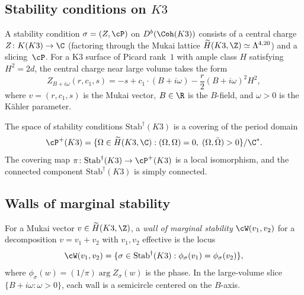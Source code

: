 \subsection{Stability conditions on $K3$}
\label{subsec:k3e-bridgeland}

\begin{definition}
\label{def:k3e-bridgeland}
A stability condition $\sigma = (Z, \cP)$ on $D^b(\Coh(K3))$ consists of a central charge $Z \colon K(K3) \to \C$ (factoring through the Mukai lattice $\widetilde{H}(K3, \Z) \simeq \Lambda^{4,20}$) and a slicing~$\cP$. For a K3 surface of Picard rank~$1$ with ample class $H$ satisfying $H^2 = 2d$, the central charge near large volume takes the form
\[
 Z_{B + i\omega}(r, c_1, s) = -s + c_1 \cdot (B + i\omega) - \frac{r}{2}(B + i\omega)^2 H^2,
\]
where $v = (r, c_1, s)$ is the Mukai vector, $B \in \R$ is the $B$-field, and $\omega > 0$ is the K\"ahler parameter.
\end{definition}

\begin{theorem}[Bridgeland 2008]
\label{thm:bridgeland-k3}
\ClaimStatusProvedElsewhere
The space of stability conditions $\mathrm{Stab}^\dagger(K3)$ is a covering of the period domain
\[
 \cP^+(K3) = \{ \Omega \in \widetilde{H}(K3, \C) : (\Omega, \Omega) = 0, \; (\Omega, \bar{\Omega}) > 0 \} / \C^*.
\]
The covering map $\pi \colon \mathrm{Stab}^\dagger(K3) \to \cP^+(K3)$ is a local isomorphism, and the connected component $\mathrm{Stab}^\dagger(K3)$ is simply connected.
\ClaimStatusProvedElsewhere
\end{theorem}

\subsection{Walls of marginal stability}
\label{subsec:k3e-walls}

\begin{definition}[Walls]
\label{def:k3e-walls}
For a Mukai vector $v \in \widetilde{H}(K3, \Z)$, a \emph{wall of marginal stability} $\cW(v_1, v_2)$ for a decomposition $v = v_1 + v_2$ with $v_1, v_2$ effective is the locus
\[
 \cW(v_1, v_2) = \{ \sigma \in \mathrm{Stab}^\dagger(K3) : \phi_\sigma(v_1) = \phi_\sigma(v_2) \},
\]
where $\phi_\sigma(w) = (1/\pi) \arg Z_\sigma(w)$ is the phase. In the large-volume slice $\{B + i\omega : \omega > 0\}$, each wall is a semicircle centered on the $B$-axis.
\end{definition}

